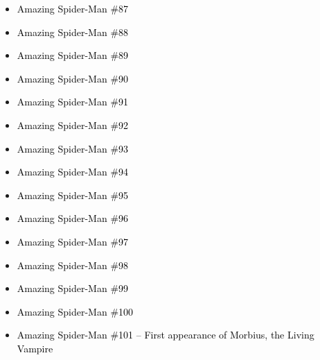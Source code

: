 \documentclass[12pt]{article}
\newcommand{\checkbox}{\raisebox{0.0ex}{\fbox{\rule{0ex}{1.5ex} \rule{1.5ex}{0ex}}}}
\begin{document}
\begin{center}
\begin{tcolorbox}[colback=white!95!gray, colframe=black, width=0.9\textwidth, arc=4mm, auto outer arc, boxrule=0.8pt]
\begin{itemize}[left=0pt,label={\checkbox}]
    \item \textcolor{black}{Amazing Spider-Man \#87}
    \item \textcolor{black}{Amazing Spider-Man \#88}
    \item \textcolor{black}{Amazing Spider-Man \#89}
    \item \textcolor{black}{Amazing Spider-Man \#90}
    \item \textcolor{black}{Amazing Spider-Man \#91}
    \item \textcolor{black}{Amazing Spider-Man \#92}
    \item \textcolor{black}{Amazing Spider-Man \#93}
    \item \textcolor{black}{Amazing Spider-Man \#94}
    \item \textcolor{black}{Amazing Spider-Man \#95}
    \item \textcolor{black}{Amazing Spider-Man \#96}
    \item \textcolor{black}{Amazing Spider-Man \#97}
    \item \textcolor{black}{Amazing Spider-Man \#98}
    \item \textcolor{black}{Amazing Spider-Man \#99}
    \item \textcolor{black}{Amazing Spider-Man \#100}
    \item \textcolor{black}{Amazing Spider-Man \#101 -- First appearance of Morbius, the Living Vampire}
\end{itemize}
\end{tcolorbox}
\end{center}
\end{document}

